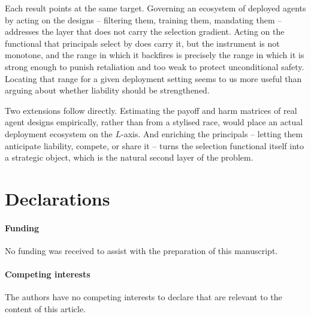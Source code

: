 \documentclass[pdflatex]{sn-jnl}
\theoremstyle{thmstyleone}
\theoremstyle{thmstylethree}
\theoremstyle{thmstyletwo}
\begin{document}
Each result points at the same target. Governing an ecosystem of deployed
agents by acting on the designs -- filtering them, training them, mandating
them -- addresses the layer that does not carry the selection gradient.
Acting on the functional that principals select by does carry it, but the
instrument is not monotone, and the range in which it backfires is precisely
the range in which it is strong enough to punish retaliation and too weak to
protect unconditional safety. Locating that range for a given deployment
setting seems to us more useful than arguing about whether liability should be
strengthened.

Two extensions follow directly. Estimating the payoff and harm matrices of
real agent designs empirically, rather than from a stylised race, would place
an actual deployment ecosystem on the $L$-axis. And enriching the principals
-- letting them anticipate liability, compete, or share it -- turns the
selection functional itself into a strategic object, which is the natural
second layer of the problem.


\backmatter


\section*{Declarations}

\paragraph{Funding}
No funding was received to assist with the preparation of this manuscript.

\paragraph{Competing interests}
The authors have no competing interests to declare that are relevant to the
content of this article.
\end{document}
